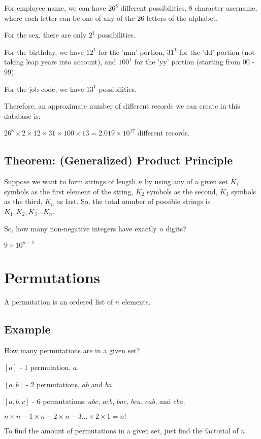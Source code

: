 \documentclass{article}
\begin{document}
For employee name, we can have $26^8$ different possibilities. 8 character username, where each letter can be one of any of the 26 letters of the alphabet.

For the sex, there are only $2^1$ possibilities.

For the birthday, we have $12^1$ for the 'mm' portion, $31^1$ for the 'dd' portion (not taking leap years into account), and $100^1$ for the 'yy' portion (starting from 00 - 99).

For the job code, we have $13^1$ possibilities.

Therefore, an approximate number of different records we can create in this database is:

$26^8 \times 2 \times 12 \times 31 \times 100 \times 13 = 2.019 \times 10^{17}$ different records. 

\subsection{Theorem: (Generalized) Product Principle}
 Suppose we want to form strings of length $n$ by using any of a given set $K_1$ symbols as the first element of the string, $K_2$ symbols as the second, $K_3$ symbols as the third, $K_n$ as last. So, the total number of possible strings is $K_1, K_2, K_3 ... K_n$.
 \linebreak
 
 So, how many non-negative integers have exactly $n$ digits?
 
 
 $9 \times 10^{n-1}$
 
 \section{Permutations}
 A permutation is an ordered list of $n$ elements. 
 \subsection{Example}
How many permutations are in a given set? 
 
$ [ a ]$ - 1 permutation, $a$.

$ [ a , b ]$ - 2 permutations, $ab$ and $ba$.

$ [ a , b , c ]$ - 6 permutations: $abc$, $acb$, $bac$, $bca$, $cab$, and $cba$.

$n \times n-1 \times n-2 \times n-3 ... \times 2 \times 1 = n!$


To find the amount of permutations in a given set, just find the factorial of $n$.
\end{document}
